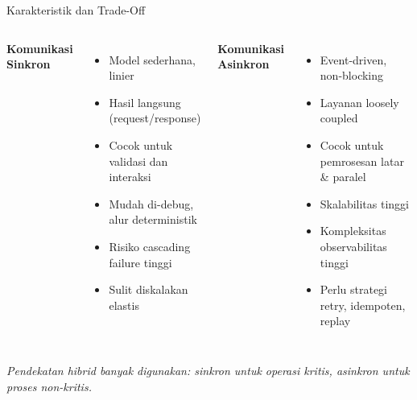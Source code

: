 \documentclass[aspectratio=169, table]{beamer}
\begin{document}
\begin{frame}[fragile]{Karakteristik dan Trade-Off}
	\vspace{20pt}
	\begin{columns}[T]
		\textbf{Komunikasi Sinkron}
		\begin{itemize}
			\item Model sederhana, linier
			\item Hasil langsung (request/response)
			\item Cocok untuk validasi dan interaksi
			\item Mudah di-debug, alur deterministik
			\item Risiko cascading failure tinggi
			\item Sulit diskalakan elastis
		\end{itemize}
		
		\textbf{Komunikasi Asinkron}
		\begin{itemize}
			\item Event-driven, non-blocking
			\item Layanan loosely coupled
			\item Cocok untuk pemrosesan latar \& paralel
			\item Skalabilitas tinggi
			\item Kompleksitas observabilitas tinggi
			\item Perlu strategi retry, idempoten, replay
		\end{itemize}
	\end{columns}
	
	\vspace{10pt}
	\scriptsize
	\textit{Pendekatan hibrid banyak digunakan: sinkron untuk operasi kritis, asinkron untuk proses non-kritis.}
\end{frame}
\end{document}
